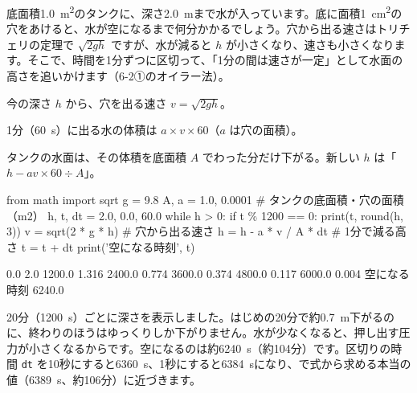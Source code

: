 \leavevmode\label{ph:力-13:sec5}底面積\qty{1.0}{m^2}のタンクに、深さ\qty{2.0}{m}まで水が入っています。底に面積\qty{1}{cm^2}の穴をあけると、水が空になるまで何分かかるでしょう。穴から出る速さはトリチェリの定理で $\sqrt{2gh}$ ですが、水が減ると $h$ が小さくなり、速さも小さくなります。そこで、時間を1分ずつに区切って、「1分の間は速さが一定」として水面の高さを追いかけます（6-2①のオイラー法）。
\begin{enumerate}[label={\bkcircled[bkBlue]{\arabic*}}, leftmargin=2.4\zw, itemsep=2pt, topsep=2pt]
\item 今の深さ $h$ から、穴を出る速さ $v=\sqrt{2gh}$。
\item 1分（\qty{60}{s}）に出る水の体積は $a\times v\times60$（$a$ は穴の面積）。
\item タンクの水面は、その体積を底面積 $A$ でわった分だけ下がる。新しい $h$ は「$h-av\times60\div A$」。
\end{enumerate}
\begin{phcode}[Python]
from math import sqrt
g = 9.8
A, a = 1.0, 0.0001       \# タンクの底面積・穴の面積（m2）
h, t, dt = 2.0, 0.0, 60.0
while h > 0:
    if t \% 1200 == 0:
        print(t, round(h, 3))
    v = sqrt(2 * g * h)      \# 穴から出る速さ
    h = h - a * v / A * dt   \# 1分で減る高さ
    t = t + dt
print('空になる時刻', t)
\end{phcode}
\begin{phcodeout}
0.0 2.0
1200.0 1.316
2400.0 0.774
3600.0 0.374
4800.0 0.117
6000.0 0.004
空になる時刻 6240.0
\end{phcodeout}
20分（\qty{1200}{s}）ごとに深さを表示しました。はじめの20分で約\qty{0.7}{m}下がるのに、終わりのほうはゆっくりしか下がりません。水が少なくなると、押し出す圧力が小さくなるからです。空になるのは約\qty{6240}{s}（約104分）です。区切りの時間 \texttt{dt} を10秒にすると\qty{6360}{s}、1秒にすると\qty{6384}{s}になり、で式から求める本当の値（\qty{6389}{s}、約106分）に近づきます。

\phkokomade



